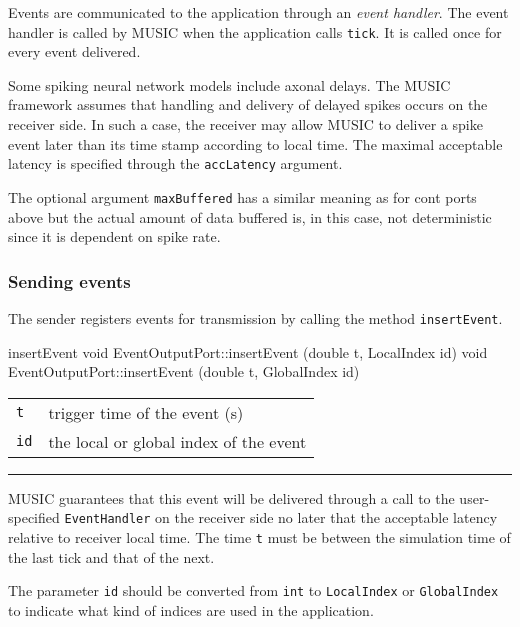 \documentclass[a4paper,twoside]{report}
\makeatletter
\newenvironment{parameters}%
{\begin{tabular}{@{\hspace{2em}}lp{0.6\textwidth}}}%
{\end{tabular}\par\vspace{1mm}\par\hrule\par\vspace{5mm}}
\makeatother
\begin{document}
Events are communicated to the application through an \emph{event
  handler}.  The event handler is called by MUSIC
when the application calls \lstinline|tick|.  It is called once for
every event delivered.

Some spiking neural network models include axonal delays.  The MUSIC
framework assumes that handling and delivery of delayed spikes occurs
on the receiver side.  In such a case, the receiver may allow MUSIC to
deliver a spike event later than its time stamp according to local
time.  The maximal acceptable latency is specified through the
\lstinline|accLatency| argument.

The optional argument \lstinline|maxBuffered|
has a similar meaning as for cont ports above but the actual amount
of data buffered is, in this case, not deterministic since it is
dependent on spike rate.


\subsubsection{Sending events}

The sender registers events for transmission by calling the method
\lstinline|insertEvent|.

\begin{head}{insertEvent}
  void EventOutputPort::insertEvent (double t,
                                     LocalIndex id)
  void EventOutputPort::insertEvent (double t,
                                     GlobalIndex id)
\end{head}
\begin{parameters}
  \lstinline|t| & trigger time of the event (s) \\
  \lstinline|id| & the local or global index of the event \\
\end{parameters}

MUSIC guarantees that this event will be delivered through a call to
the user-specified \lstinline|EventHandler| on the receiver side no
later that the acceptable latency relative to receiver local time.
The time \lstinline|t| must be between the simulation time of the last
tick and that of the next.

The parameter \lstinline|id| should be converted from \lstinline|int|
to \lstinline|LocalIndex| or \lstinline|GlobalIndex| to indicate what
kind of indices are used in the application.
\end{document}
